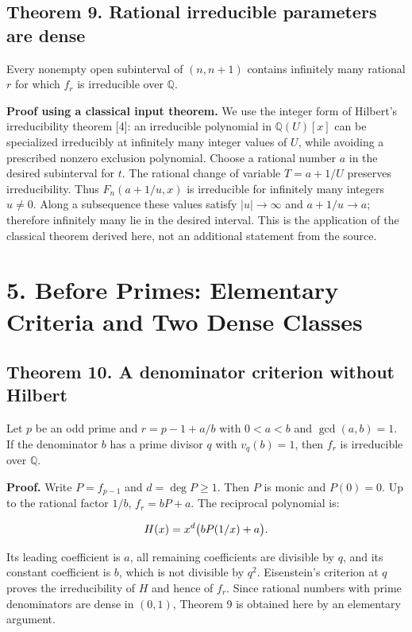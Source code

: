\documentclass[11pt,a4paper]{article}
\newcommand{\fitmath}[1]{\begingroup\setbox0=\hbox{$\displaystyle #1$}\ifdim\wd0>\linewidth\resizebox{\linewidth}{!}{\box0}\else\box0\fi\endgroup}
\begin{document}
\subsection*{Theorem 9. Rational irreducible parameters are dense}

Every nonempty open subinterval of $(n,n+1)$ contains infinitely many rational $r$ for which $f_r$ is irreducible over $\mathbb Q$.


\textbf{Proof using a classical input theorem.} We use the integer form of Hilbert's irreducibility theorem [4]: an irreducible polynomial in $\mathbb Q(U)[x]$ can be specialized irreducibly at infinitely many integer values of $U$, while avoiding a prescribed nonzero exclusion polynomial. Choose a rational number $a$ in the desired subinterval for $t$. The rational change of variable $T=a+1/U$ preserves irreducibility. Thus $F_n(a+1/u,x)$ is irreducible for infinitely many integers $u\ne0$. Along a subsequence these values satisfy $|u|\to\infty$ and $a+1/u\to a$; therefore infinitely many lie in the desired interval. This is the application of the classical theorem derived here, not an additional statement from the source.


\section*{5. Before Primes: Elementary Criteria and Two Dense Classes}

\subsection*{Theorem 10. A denominator criterion without Hilbert}

Let $p$ be an odd prime and $r=p-1+a/b$ with $0<a<b$ and $\gcd(a,b)=1$. If the denominator $b$ has a prime divisor $q$ with $v_q(b)=1$, then $f_r$ is irreducible over $\mathbb Q$.


\textbf{Proof.} Write $P=f_{p-1}$ and $d=\deg P\geq1$. Then $P$ is monic and $P(0)=0$. Up to the rational factor $1/b$, $f_r=bP+a$. The reciprocal polynomial is:


\[
\fitmath{H(x)=x^d\bigl(bP(1/x)+a\bigr).}
\]


Its leading coefficient is $a$, all remaining coefficients are divisible by $q$, and its constant coefficient is $b$, which is not divisible by $q^2$. Eisenstein's criterion at $q$ proves the irreducibility of $H$ and hence of $f_r$. Since rational numbers with prime denominators are dense in $(0,1)$, Theorem 9 is obtained here by an elementary argument.
\end{document}
